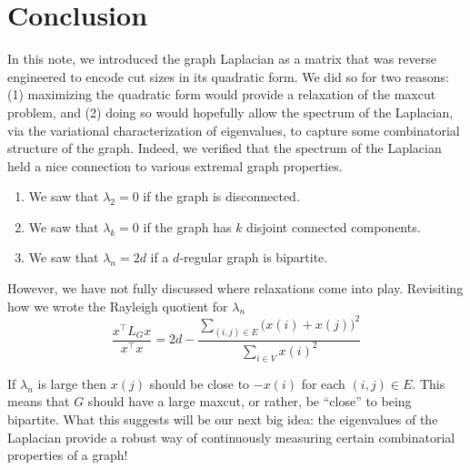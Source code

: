 \section{Conclusion}

In this note, we introduced the graph Laplacian as a matrix that was reverse engineered to encode cut sizes in its quadratic form. We did so for two reasons: (1) maximizing the quadratic form would provide a relaxation of the maxcut problem, and (2) doing so would hopefully allow the spectrum of the Laplacian, via the variational characterization of eigenvalues, to capture some combinatorial structure of the graph. Indeed, we verified that the spectrum of the Laplacian held a nice connection to various extremal graph properties.
\vspace{-1em}
\begin{enumerate}[-]
  \item We saw that $\lambda_2 = 0$ if the graph is disconnected.

  \item We saw that $\lambda_k = 0$ if the graph has $k$ disjoint connected components.

  \item We saw that $\lambda_n = 2d$ if a $d$-regular graph is bipartite.
\end{enumerate}

However, we have not fully discussed where relaxations come into play. Revisiting how we wrote the Rayleigh quotient for $\lambda_n$
\begin{equation*}
\frac{x^\top L_G x}{x^\top x}
= 2d - \frac{\sum_{(i, j) \in E} \big( x(i) + x(j) \big)^2 }{\sum_{i \in V} x(i)^2}
\end{equation*}

If $\lambda_n$ is large then $x(j)$ should be close to $-x(i)$ for each $(i, j) \in E$. This means that $G$ should have a large maxcut, or rather, be ``close'' to being bipartite. What this suggests will be our next big idea: the eigenvalues of the Laplacian provide a robust way of continuously measuring certain combinatorial properties of a graph!
